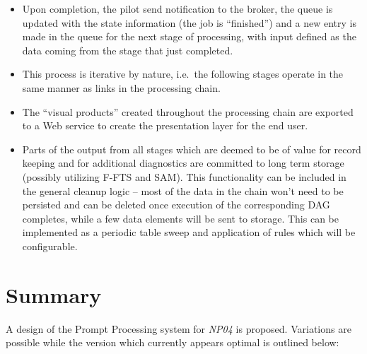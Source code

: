 \documentclass[pdftex,12pt,letter]{article}
\newcommand{\expname}{\textit{NP04}\xspace}
\begin{document}
\begin{itemize}
\item Upon completion, the pilot send notification to the broker, the queue is updated with the state information (the job is ``finished'') and
a new entry is made in the queue for the next stage of processing, with input defined as the data coming from the stage that just completed.

\item This process is iterative by nature, i.e.~the following stages operate in the same manner as links in the processing chain.

\item The ``visual products'' created throughout the processing chain are exported to a Web service to create the presentation
layer for the end user.

\item Parts of the output from all stages which are deemed to be of value for record keeping and for additional
diagnostics are committed to long term storage (possibly utilizing F-FTS and SAM). This functionality can be included
in the general cleanup logic -- most of the data in the chain won't need to be persisted and can be deleted once
execution of the corresponding DAG completes, while a few data elements will be sent to storage. This can be
implemented as a periodic table sweep and application of rules which will be configurable.

\end{itemize}

\section{Summary}
A design of the Prompt Processing system for \expname is proposed. Variations are possible
while the version which currently appears optimal is outlined below:
\end{document}
